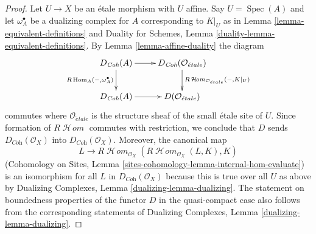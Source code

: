\documentclass[10pt,a4paper]{amsart}
\theoremstyle{plain}
\theoremstyle{definition}
\theoremstyle{remark}
\numberwithin{equation}{subsection}
\def\Spec{\mathop{\mathrm{Spec}}}
\def\Hom{\mathop{\mathrm{Hom}}\nolimits}
\def\SheafHom{\mathop{\mathcal{H}\!\mathit{om}}\nolimits}
\def\etale{{\acute{e}tale}}
\begin{document}
\begin{proof}
Let $U \to X$ be an \'etale morphism with $U$ affine. Say $U = \Spec(A)$ and
let $\omega_A^\bullet$ be a dualizing complex for $A$ corresponding to $K|_U$
as in Lemma \ref{lemma-equivalent-definitions} and
Duality for Schemes, Lemma \ref{duality-lemma-equivalent-definitions}.
By Lemma \ref{lemma-affine-duality} the diagram
$$
\xymatrix{
D_{\textit{Coh}}(A) \ar[r] \ar[d]_{R\Hom_A(-, \omega_A^\bullet)} &
D_{\textit{Coh}}(\mathcal{O}_\etale)
\ar[d]^{R\SheafHom_{\mathcal{O}_\etale}(-, K|_U)} \\
D_{\textit{Coh}}(A) \ar[r] &
D(\mathcal{O}_\etale)
}
$$
commutes where $\mathcal{O}_\etale$ is the structure sheaf of the
small \'etale site of $U$. Since formation of $R\SheafHom$ commutes
with restriction, we conclude that $D$ sends
$D_{\textit{Coh}}(\mathcal{O}_X)$ into
$D_{\textit{Coh}}(\mathcal{O}_X)$. Moreover, the canonical map
$$
L \longrightarrow
R\SheafHom_{\mathcal{O}_X}(R\SheafHom_{\mathcal{O}_X}(L, K), K)
$$
(Cohomology on Sites, Lemma \ref{sites-cohomology-lemma-internal-hom-evaluate})
is an isomorphism for all $L$ in $D_{\textit{Coh}}(\mathcal{O}_X)$
because this is true over all $U$ as above by
Dualizing Complexes, Lemma \ref{dualizing-lemma-dualizing}.
The statement on boundedness properties of the functor $D$
in the quasi-compact case also follows from the corresponding
statements of Dualizing Complexes, Lemma \ref{dualizing-lemma-dualizing}.
\end{proof}
\end{document}
